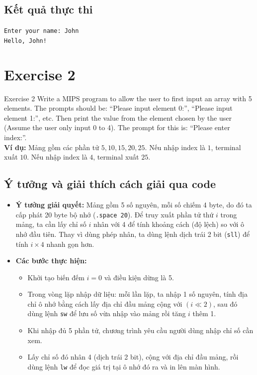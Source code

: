 \documentclass[a4paper]{article}
\numberwithin{figure}{section}
\numberwithin{table}{section}
\begin{document}
\subsection{Kết quả thực thi}
\begin{outputbox}
\texttt{Enter your name: John}\\
\texttt{Hello, John!}
\end{outputbox}

\pagebreak

\section{Exercise 2}

\begin{problembox}{Exercise 2}
Write a MIPS program to allow the user to first input an array with 5 elements. The prompts should be: ``Please input element 0:'', ``Please input element 1:'', etc. Then print the value from the element chosen by the user (Assume the user only input 0 to 4). The prompt for this is: ``Please enter index:''.\\
\textbf{Ví dụ:} Mảng gồm các phần tử $5, 10, 15, 20, 25$. Nếu nhập index là $1$, terminal xuất $10$. Nếu nhập index là $4$, terminal xuất $25$.
\end{problembox}

\subsection{Ý tưởng và giải thích cách giải qua code}
\begin{itemize}[leftmargin=*]
    \item \textbf{Ý tưởng giải quyết:}
    Mảng gồm 5 số nguyên, mỗi số chiếm 4 byte, do đó ta cấp phát 20 byte bộ nhớ (\texttt{.space 20}). Để truy xuất phần tử thứ $i$ trong mảng, ta cần lấy chỉ số $i$ nhân với 4 để tính khoảng cách (độ lệch) so với ô nhớ đầu tiên. Thay vì dùng phép nhân, ta dùng lệnh dịch trái 2 bit (\texttt{sll}) để tính $i \times 4$ nhanh gọn hơn.
    
    \item \textbf{Các bước thực hiện:}
    \begin{itemize}[leftmargin=*]
        \item Khởi tạo biến đếm $i = 0$ và điều kiện dừng là 5.
        \item Trong vòng lặp nhập dữ liệu: mỗi lần lặp, ta nhập 1 số nguyên, tính địa chỉ ô nhớ bằng cách lấy địa chỉ đầu mảng cộng với $(i \ll 2)$, sau đó dùng lệnh \texttt{sw} để lưu số vừa nhập vào mảng rồi tăng $i$ thêm 1.
        \item Khi nhập đủ 5 phần tử, chương trình yêu cầu người dùng nhập chỉ số cần xem.
        \item Lấy chỉ số đó nhân 4 (dịch trái 2 bit), cộng với địa chỉ đầu mảng, rồi dùng lệnh \texttt{lw} để đọc giá trị tại ô nhớ đó ra và in lên màn hình.
    \end{itemize}
\end{itemize}
\end{document}
